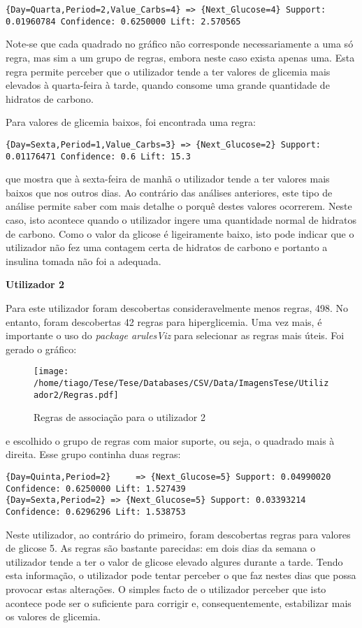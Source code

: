 \begin{lstlisting}
{Day=Quarta,Period=2,Value_Carbs=4} => {Next_Glucose=4} Support: 0.01960784 Confidence: 0.6250000 Lift: 2.570565

\end{lstlisting}   
Note-se que cada quadrado no gráfico não corresponde necessariamente a uma só regra, mas sim a um grupo de regras, embora neste caso exista apenas uma. Esta regra permite perceber que o utilizador tende a ter valores de glicemia mais elevados à quarta-feira à tarde, quando consome uma grande quantidade de hidratos de carbono.

Para valores de glicemia baixos, foi encontrada uma regra:

\begin{lstlisting}
{Day=Sexta,Period=1,Value_Carbs=3} => {Next_Glucose=2} Support:  0.01176471 Confidence: 0.6 Lift: 15.3
\end{lstlisting}
que mostra que à sexta-feira de manhã o utilizador tende a ter valores mais baixos que nos outros dias. Ao contrário das análises anteriores, este tipo de análise permite saber com mais detalhe o porquê destes valores ocorrerem. Neste caso, isto acontece quando o utilizador ingere uma quantidade normal de hidratos de carbono. Como o valor da glicose é ligeiramente baixo, isto pode indicar que o utilizador não fez uma contagem certa de hidratos de carbono e portanto a insulina tomada não foi a adequada.


\textbf{Utilizador 2}

Para este utilizador foram descobertas consideravelmente menos regras, 498. No entanto, foram descobertas 42 regras para hiperglicemia. Uma vez mais, é importante o uso do \textit{package arulesViz} para selecionar as regras mais úteis. Foi gerado o gráfico:


\begin{figure}[H]
\centering
\texttt{[image: /home/tiago/Tese/Tese/Databases/CSV/Data/ImagensTese/Utilizador2/Regras.pdf]}
\caption{Regras de associação para o utilizador 2}
\end{figure}
e escolhido o grupo de regras com maior suporte, ou seja, o quadrado mais à direita. Esse grupo continha duas regras:

\begin{lstlisting}
{Day=Quinta,Period=2}     => {Next_Glucose=5} Support: 0.04990020 Confidence: 0.6250000 Lift: 1.527439
{Day=Sexta,Period=2} => {Next_Glucose=5} Support: 0.03393214  Confidence: 0.6296296 Lift: 1.538753

\end{lstlisting}   
Neste utilizador, ao contrário do primeiro, foram descobertas regras para valores de glicose 5. As regras são bastante parecidas: em dois dias da semana o utilizador tende a ter o valor de glicose elevado algures durante a tarde. Tendo esta informação, o utilizador pode tentar perceber o que faz nestes dias que possa provocar estas alterações. O simples facto de o utilizador perceber que isto acontece pode ser o suficiente para corrigir e, consequentemente, estabilizar mais os valores de glicemia.


